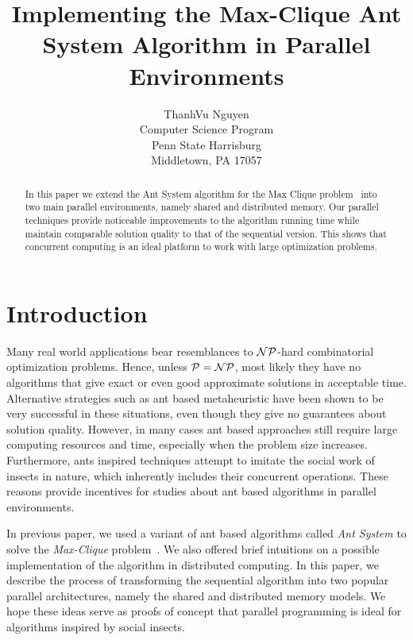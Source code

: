 \documentclass[11pt]{article}
\begin{document}
  

\title{Implementing the Max-Clique Ant System Algorithm in Parallel Environments} 
\author{ 
ThanhVu Nguyen\\ 
Computer Science Program\\ 
Penn State Harrisburg\\ 
Middletown, PA 17057\\ 
}  
\maketitle  


\begin{abstract}
In this paper we extend the Ant System algorithm for the Max Clique problem~\cite{BR} into two main parallel environments, namely shared and distributed memory. Our parallel techniques provide noticeable improvements to the algorithm running time while maintain comparable solution quality to that of the sequential version.  This shows that concurrent computing is an ideal platform to work with large optimization problems.
\end{abstract}


\section{Introduction}\label{intro}


Many real world applications bear resemblances to  $\cal NP$-hard combinatorial optimization problems.  Hence, unless $\cal P = NP$, most likely they have no algorithms that give exact or even good approximate solutions in acceptable time.  Alternative strategies such as ant based metaheuristic  have been shown to be very successful in these situations, even though they give no guarantees about solution quality.  However, in many cases ant based approaches still require large computing resources and time, especially when the problem size increases.  Furthermore, ants inspired techniques attempt to imitate the social work of insects in nature, which inherently includes their concurrent operations.  These reasons provide incentives for studies about ant based algorithms in parallel environments.

In previous paper, we used a variant of ant based algorithms called \textit{Ant System} to solve the \textit{Max-Clique} problem~\cite{BR}. We also offered brief intuitions on a possible implementation of the algorithm in distributed computing.  In this paper, we describe the process of transforming the sequential algorithm into two popular parallel architectures, namely the shared and distributed memory models. We hope these ideas serve as proofs of concept that parallel programming is ideal for algorithms inspired by social insects.
\end{document}
